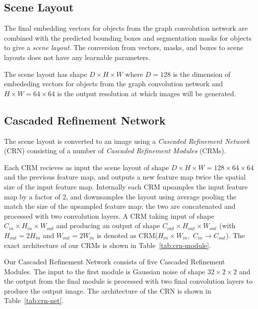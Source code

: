 \documentclass[10pt,twocolumn,letterpaper]{article}
\begin{document}
\subsection{Scene Layout}
The final embedding vectors for objects from the graph convolution network are combined with
the predicted bounding boxes and segmentation masks for objects to give a \emph{scene layout}.
The conversion from vectors, masks, and boxes to scene layouts does not have any learnable parameters.

The scene layout has shape $D\times H\times W$ where $D=128$ is the dimension of embededing vectors
for objects from the graph convolution network and $H\times W=64\times64$ is the output resolution at
which images will be generated.

\subsection{Cascaded Refinement Network}
The scene layout is converted to an image using a \emph{Cascaded Refinement Network} (CRN) consisting of a
number of \emph{Cascaded Refinement Modules} (CRMs).

Each CRM recieves as input the scene layout of shape $D\times H\times W=128\times 64\times 64$ and the
previous feature map, and outputs a new feature map twice the spatial size of the input feature map.
Internally each CRM upsamples the input feature map by a factor of 2, and downsamples the layout using
average pooling the match the size of the upsampled feature map; the two are concatenated and processed
with two convolution layers. A CRM taking input of shape $C_{in}\times H_{in}\times W_{out}$ and producing
an output of shape $C_{out}\times H_{out}\times W_{out}$ (with $H_{out}=2 H_{in}$ and $W_{out}=2 W_{in}$
is denoted as CRM($H_{in}\times W_{in},\; C_{in}\to C_{out}$). The exact architecture of our CRMs is
shown in Table~\ref{tab:crn-module}.

Our Cascaded Refinement Network consists of five Cascaded Refinement Modules. The input to the first
module is Gaussian noise of shape $32\times2\times2$ and the output from the final module is processed
with two final convolution layers to produce the output image. The architecture of the CRN is shown
in Table~\ref{tab:crn-net}.
\end{document}

